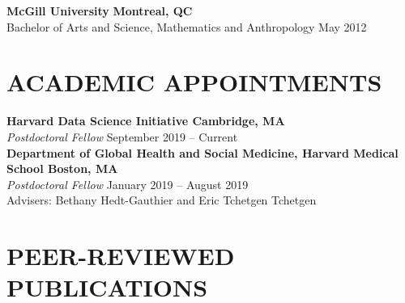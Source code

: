\documentclass[12pt]{article}
\begin{document}
\textbf{McGill University} \hfill \hfill \textbf{Montreal, QC} \\
Bachelor of Arts and Science, Mathematics and Anthropology  \hfill \hfill May 2012 


\section*{\textbf{{\large A}CADEMIC {\large A}PPOINTMENTS }}

\textbf{Harvard Data Science Initiative \hfill \hfill Cambridge, MA} \\
\textit{Postdoctoral Fellow}  \hfill \hfill September 2019 -- Current \\

\textbf{Department of Global Health and Social Medicine, Harvard Medical School \hfill \hfill Boston, MA} \\
\textit{Postdoctoral Fellow} \hfill \hfill January 2019 -- August 2019 \\
Advisers: Bethany Hedt-Gauthier and Eric Tchetgen Tchetgen 

\section*{\textbf{{\large P}{EER}-{\large R}{EVIEWED} {\large P}{UBLICATIONS}}}
\end{document}
